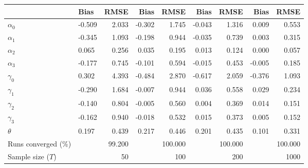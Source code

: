 
\begin{tabular}[t]{llrrrrrrr}
\toprule
  & Bias & RMSE & Bias & RMSE & Bias & RMSE & Bias & RMSE\\
\midrule
$\alpha_{0}$ & -0.509 & 2.033 & -0.302 & 1.745 & -0.043 & 1.316 & 0.009 & 0.553\\
$\alpha_{1}$ & -0.345 & 1.093 & -0.198 & 0.944 & -0.035 & 0.739 & 0.003 & 0.315\\
$\alpha_{2}$ & 0.065 & 0.256 & 0.035 & 0.195 & 0.013 & 0.124 & 0.000 & 0.057\\
$\alpha_{3}$ & -0.177 & 0.745 & -0.101 & 0.594 & -0.015 & 0.453 & -0.005 & 0.185\\
$\gamma_{0}$ & 0.302 & 4.393 & -0.484 & 2.870 & -0.617 & 2.059 & -0.376 & 1.093\\
$\gamma_{1}$ & -0.290 & 1.684 & -0.007 & 0.944 & 0.036 & 0.558 & 0.029 & 0.234\\
$\gamma_{2}$ & -0.140 & 0.804 & -0.005 & 0.560 & 0.004 & 0.369 & 0.014 & 0.151\\
$\gamma_{3}$ & -0.162 & 0.940 & -0.018 & 0.532 & 0.015 & 0.373 & 0.005 & 0.152\\
$\theta$ & 0.197 & 0.439 & 0.217 & 0.446 & 0.201 & 0.435 & 0.101 & 0.331\\
Runs converged (\%) &  & 99.200 &  & 100.000 &  & 100.000 &  & 100.000\\
Sample size ($T$) &  & 50 &  & 100 &  & 200 &  & 1000\\
\bottomrule
\end{tabular}
